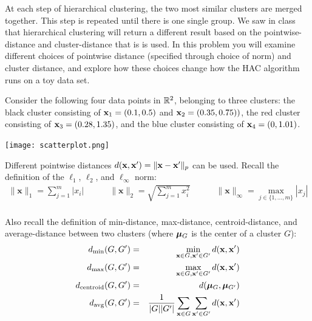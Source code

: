 \documentclass[submit]{harvardml}
\begin{document}
\begin{problem}
  
At each step of hierarchical clustering, the two most similar clusters
are merged together. This step is repeated until there is one single
group. We saw in class that hierarchical clustering will return a
different result based on the pointwise-distance and cluster-distance
that is is used. In this problem you will examine different choices of
pointwise distance (specified through choice of norm) and cluster
distance, and explore how these choices change how the HAC algorithm
runs on a toy data set.

  
 Consider the following four data points in $\mathbb{R}^2$, belonging to three clusters: the
  black cluster consisting of $\mathbf{x}_1 = (0.1, 0.5) $ and $\mathbf{x}_2 = (0.35, 0.75))$,
  the red cluster consisting of $\mathbf{x}_3 = (0.28, 1.35)$, and the blue cluster
  consisting of $\mathbf{x}_4 = (0, 1.01)$.

  \begin{center} \texttt{[image: scatterplot.png]} \end{center}


  Different pointwise distances $d(\mathbf{x}, \mathbf{x}') = \|\mathbf{x} - \mathbf{x}'\|_p$
  can be used.  Recall the definition of the
  $\ell_1$, $\ell_2$, and $\ell_{\infty}$ norm:
  \begin{eqnarray*}
     \| \mathbf{x} \|_1 = \sum_{j = 1}^m |x_i| \quad \quad\quad \| \mathbf{x} \|_2 = \sqrt{\sum_{j = 1}^m x_i^2 } \quad\quad\quad
     \| \mathbf{x} \|_{\infty} = \max_{j \in \{1, \ldots, m\}} |x_j|\\
  \end{eqnarray*}
  
  Also recall the definition of min-distance, max-distance,
  centroid-distance, and average-distance between two clusters (where $\boldsymbol{\mu}_{G}$
is the center of a cluster $G$):
%
\begin{eqnarray*}
    d_{\text{min}}(G, G') &=& \min_{\mathbf{x}  \in G, \mathbf{x}' \in G'} d(\mathbf{x}, \mathbf{x}')\\
    d_{\text{max}}(G, G') &=& \max_{\mathbf{x}  \in G, \mathbf{x}' \in G'} d(\mathbf{x}, \mathbf{x}')\\
    d_{\text{centroid}}(G, G') &=&  d(\boldsymbol{\mu}_{G}, \boldsymbol{\mu}_{G'})\\
    d_{\text{avg}}(G, G') &=&\frac{1}{|G| |G'|} \sum_{\mathbf{x} \in G}\sum_{\mathbf{x}'  \in G'} d(\mathbf{x}, \mathbf{x}')\\
  \end{eqnarray*}


\end{problem}
\end{document}
